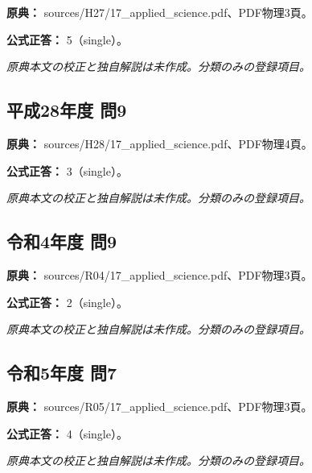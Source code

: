 \noindent\textbf{原典：} sources/H27/17\_applied\_science.pdf、PDF物理3頁。

\textbf{公式正答：} 5（single）。

\par\textit{原典本文の校正と独自解説は未作成。分類のみの登録項目。}

\subsection{平成28年度 問9}
\label{q:h28-reg-applied-09}

\noindent\textbf{原典：} sources/H28/17\_applied\_science.pdf、PDF物理4頁。

\textbf{公式正答：} 3（single）。

\par\textit{原典本文の校正と独自解説は未作成。分類のみの登録項目。}

\subsection{令和4年度 問9}
\label{q:r04-reg-applied-09}

\noindent\textbf{原典：} sources/R04/17\_applied\_science.pdf、PDF物理3頁。

\textbf{公式正答：} 2（single）。

\par\textit{原典本文の校正と独自解説は未作成。分類のみの登録項目。}

\subsection{令和5年度 問7}
\label{q:r05-reg-applied-07}

\noindent\textbf{原典：} sources/R05/17\_applied\_science.pdf、PDF物理3頁。

\textbf{公式正答：} 4（single）。

\par\textit{原典本文の校正と独自解説は未作成。分類のみの登録項目。}

